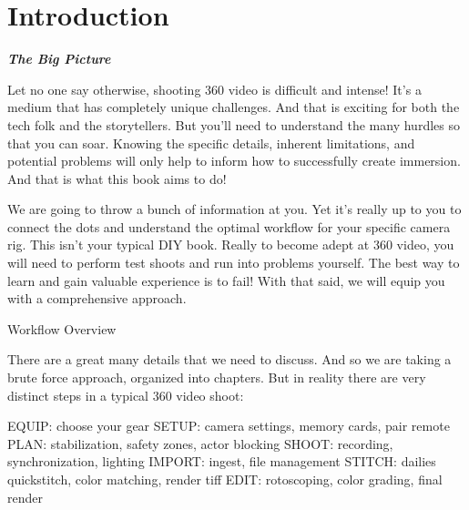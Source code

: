 
\SkipTocEntry\chapter*{Introduction}
\addtocounter{section}{2}
\begin{fullwidth}

{\itshape\bfseries The Big Picture

}

Let no one say otherwise, shooting 360 video is difficult and intense! It’s a medium that has completely unique challenges. And that is exciting for both the tech folk and the storytellers. But you’ll need to understand the many hurdles so that you can soar. Knowing the specific details, inherent limitations, and potential problems will only help to inform how to successfully create immersion. And that is what this book aims to do!

We are going to throw a bunch of information at you. Yet it's really up to you to connect the dots and understand the optimal workflow for your specific camera rig. This isn’t your typical DIY book. Really to become adept at 360 video, you will need to perform test shoots and run into problems yourself. The best way to learn and gain valuable experience is to fail! With that said, we will equip you with a comprehensive approach.

{\large Workflow Overview \par}

There are a great many details that we need to discuss. And so we are taking a brute force approach, organized into chapters. But in reality there are very distinct steps in a typical 360 video shoot:

EQUIP: choose your gear
SETUP: camera settings, memory cards, pair remote
PLAN: stabilization, safety zones, actor blocking
SHOOT: recording, synchronization, lighting
IMPORT: ingest, file management 
STITCH: dailies quickstitch, color matching, render tiff
EDIT: rotoscoping, color grading, final render

\clearpage
\end{fullwidth}
